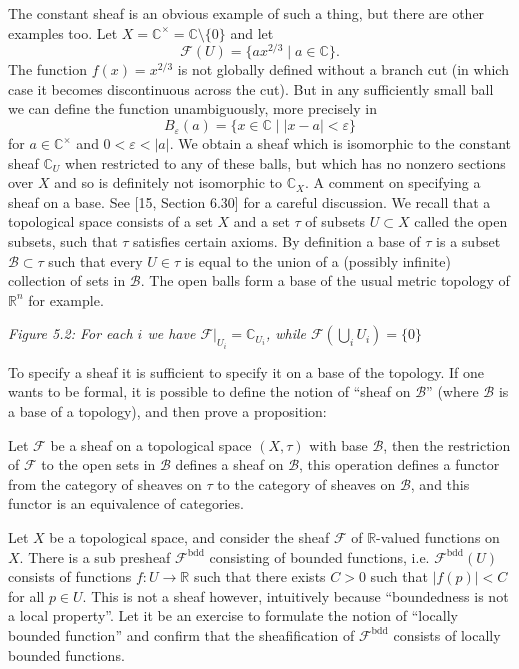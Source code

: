 The constant sheaf is an obvious example of such a thing, but there are other examples too.
Let $X=\mathbb C^\times=\mathbb C\setminus\{0\}$ and let
\[
\mathcal F(U)=\{ax^{2/3}\mid a\in\mathbb C\}.
\]
The function $f(x)=x^{2/3}$ is not globally defined without a branch cut (in which case it
becomes discontinuous across the cut). But in any sufficiently small ball we can define the
function unambiguously, more precisely in
\[
B_\varepsilon(a)=\{x\in\mathbb C\mid |x-a|<\varepsilon\}
\]
for $a\in\mathbb C^\times$ and $0<\varepsilon<|a|$.
We obtain a sheaf which is isomorphic to the constant sheaf $\mathbb C_U$ when restricted to any of
these balls, but which has no nonzero sections over $X$ and so is definitely not isomorphic to
$\mathbb C_X$.
A comment on specifying a sheaf on a base. See [15, Section 6.30] for a careful discussion.
We recall that a topological space consists of a set $X$ and a set $\tau$ of subsets $U\subset X$ called
the open subsets, such that $\tau$ satisfies certain axioms. By definition a base of $\tau$ is a subset
$\mathcal B\subset\tau$ such that every $U\in\tau$ is equal to the union of a (possibly infinite) collection of sets
in $\mathcal B$. The open balls form a base of the usual metric topology of $\mathbb R^n$ for example.

\medskip\noindent
{\it Figure 5.2: For each $i$ we have $\mathcal F|_{U_i}=\mathbb C_{U_i}$, while
$\mathcal F(\bigcup_i U_i)=\{0\}$}

To specify a sheaf it is sufficient to specify it on a base of the topology. If one wants to be
formal, it is possible to define the notion of “sheaf on $\mathcal B$” (where $\mathcal B$ is a base of a topology),
and then prove a proposition:

\begin{proposition}
Let $\mathcal F$ be a sheaf on a topological space $(X,\tau)$ with base $\mathcal B$, then the
restriction of $\mathcal F$ to the open sets in $\mathcal B$ defines a sheaf on $\mathcal B$, this operation defines a functor
from the category of sheaves on $\tau$ to the category of sheaves on $\mathcal B$, and this functor is an
equivalence of categories.
\end{proposition}

\begin{example}
Let $X$ be a topological space, and consider the sheaf $\mathcal F$ of $\mathbb R$-valued functions
on $X$. There is a sub presheaf $\mathcal F^{\mathrm{bdd}}$ consisting of bounded functions, i.e.
$\mathcal F^{\mathrm{bdd}}(U)$ consists of functions $f:U\to\mathbb R$ such that there exists $C>0$
such that $|f(p)|<C$ for all $p\in U$.
This is not a sheaf however, intuitively because “boundedness is not a local property”. Let
it be an exercise to formulate the notion of “locally bounded function” and confirm that the
sheafification of $\mathcal F^{\mathrm{bdd}}$ consists of locally bounded functions.
\end{example}

